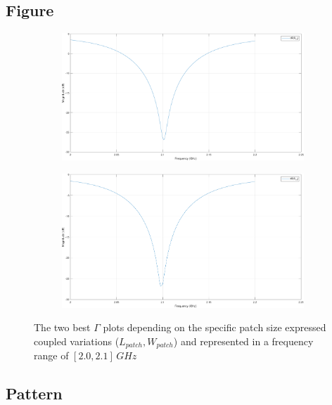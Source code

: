 \documentclass[12pt,a4paper,twocolumn]{article}
\begin{document}
{\subsection*{Figure}
\begin{figure}
	\begin{center}
		\begin{subfigure}{0.5\linewidth}
			\includegraphics[scale=0.25]{gamma1.pdf}
		\end{subfigure}
		\begin{subfigure}{0.5\linewidth}
			\includegraphics[scale=0.25]{gamma3.pdf}
		\end{subfigure}
		\caption{\selectfont
			\color{gray}The two best $\Gamma$ plots depending on the specific patch size expressed coupled variations ($L_{patch},W_{patch}$) and represented in a frequency range of $[2.0,2.1]\,GHz$}
		\label{fig:Gamma couple LpWp}
	\end{center}  
\end{figure}
\subsection*{Pattern}


}
\end{document}
